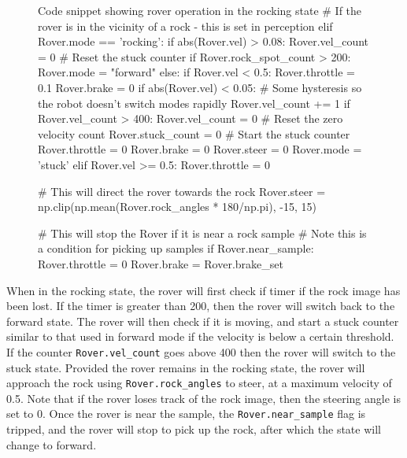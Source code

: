 \documentclass[a4paper]{article}
\begin{document}
\begin{figure}[h]\scriptsize
\begin{sexylisting}{Code snippet showing rover operation in the rocking state}
# If the rover is in the vicinity of a rock - this is set in perception 
        elif Rover.mode == 'rocking':
            if abs(Rover.vel) > 0.08:
                Rover.vel_count = 0 # Reset the stuck counter
            if Rover.rock_spot_count > 200:
                Rover.mode = "forward"
            else:
                if Rover.vel < 0.5:
                    Rover.throttle = 0.1
                    Rover.brake = 0
                    if abs(Rover.vel) < 0.05:
                        # Some hysteresis so the robot doesn't switch modes rapidly
                        Rover.vel_count += 1
                        if Rover.vel_count > 400:
                            Rover.vel_count = 0 # Reset the zero velocity count
                            Rover.stuck_count = 0 # Start the stuck counter
                            Rover.throttle = 0
                            Rover.brake = 0
                            Rover.steer = 0
                            Rover.mode = 'stuck'
                elif Rover.vel >= 0.5:
                    Rover.throttle = 0
                
                # This will direct the rover towards the rock
                Rover.steer = np.clip(np.mean(Rover.rock_angles * 180/np.pi), -15, 15)
                
                # This will stop the Rover if it is near a rock sample
                # Note this is a condition for picking up samples
                if Rover.near_sample:
                    Rover.throttle = 0
                    Rover.brake = Rover.brake_set
\end{sexylisting}
\end{figure}

When in the rocking state, the rover will first check if timer if the rock image has been lost. If the timer is greater than 200, then the rover will switch back to the forward state. The rover will then check if it is moving, and start a stuck counter similar to that used in forward mode if the velocity is below a certain threshold. If the counter \verb|Rover.vel_count| goes above 400 then the rover will switch to the stuck state. Provided the rover remains in the rocking state, the rover will approach the rock using \verb|Rover.rock_angles| to steer, at a maximum velocity of 0.5. Note that if the rover loses track of the rock image, then the steering angle is set to 0. Once the rover is near the sample, the \verb|Rover.near_sample| flag is tripped, and the rover will stop to pick up the rock, after which the state will change to forward.\\
\end{document}

